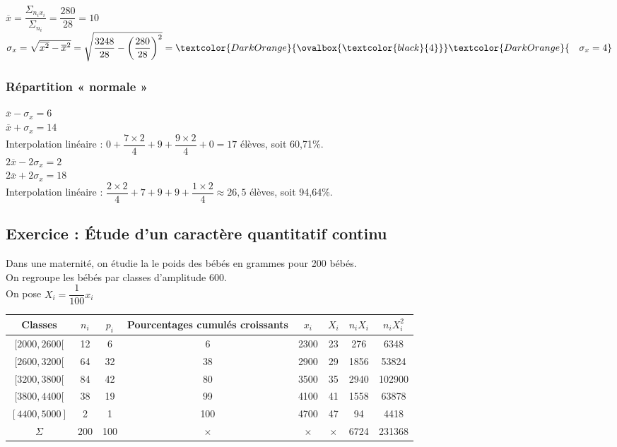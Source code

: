 \vspace*{.3cm}

$\overline{x} = \dfrac{\Sigma_{n_ix_i}}{\Sigma_{n_i}} = \dfrac{280}{28} = 10 $ \\

$\sigma_x = \sqrt{\overline{x^2} - \overline{x}^2} = \sqrt{\dfrac{3248}{28} - \left(\dfrac{280}{28}\right)^2} = \textcolor{DarkOrange}{\ovalbox{\textcolor{black}{4}}} \textcolor{DarkOrange}{\quad \sigma_x = 4}$ \\

\subsubsection{Répartition « normale »}

$\overline{x} - \sigma_x = 6$ \\
$\overline{x} + \sigma_x = 14$ \\

Interpolation linéaire : $ 0 + \dfrac{7 \times 2}{4} + 9 + \dfrac{9 \times 2}{4} + 0 = 17$ élèves, soit 60,71\%. \\

$2\overline{x} - 2\sigma_x = 2$ \\
$2\overline{x} + 2\sigma_x = 18$ \\

Interpolation linéaire : $ \dfrac{2 \times 2}{4} + 7 + 9 + 9 + \dfrac{1 \times 2}{4} \approx 26,5$ élèves, soit 94,64\%.

\newpage

\subsection{Exercice : Étude d'un caractère quantitatif continu}

Dans une maternité, on étudie la le poids des bébés en grammes pour 200 bébés. \\

On regroupe les bébés par classes d'amplitude 600. \\

On pose $X_i = \dfrac{1}{100}x_i$ \\

\begin{tabular}{c|c|c|c|c|c|c|c}
Classes & $n_i$ & $p_i$ & Pourcentages cumulés croissants & $x_i$ & $X_i$ & $n_iX_i$ & $n_iX_i^2$ \\
\hline
$[2000,2600[$ & 12 & 6 & 6 & 2300 & 23 & 276 & 6348 \\
$[2600,3200[$ & 64 & 32 & 38 & 2900 & 29 & 1856 & 53824 \\
$[3200,3800[$ & 84 & 42 & 80 & 3500 & 35 & 2940 & 102900 \\
$[3800,4400[$ & 38 & 19 & 99 & 4100 & 41 & 1558 & 63878 \\
$[4400,5000]$ & 2 & 1 & 100 & 4700 & 47 & 94 & 4418 \\
\hline
$\Sigma$ & 200 & 100 & {\Large {$\times$}} & {\Large {$\times$}} & {\Large {$\times$}} & 6724 & 231368 \\
\end{tabular}

